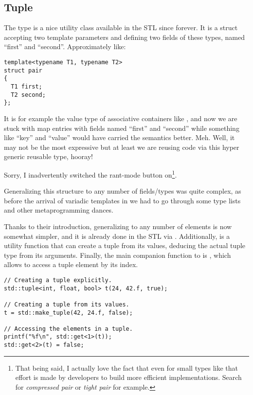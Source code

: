 \subsection{Tuple}
\label{sec:tuple}

\problemtitle

The type  is a nice utility class available in the STL
since forever. It is a struct accepting two template parameters and
defining two fields of these types, named ``first'' and
``second''. Approximately like:

\begin{lstlisting}
template<typename T1, typename T2>
struct pair
{
  T1 first;
  T2 second;
};
\end{lstlisting}

It is for example the value type of associative containers like
, and now we are stuck with map entries with fields
named ``first'' and ``second'' while something like ``key'' and
``value'' would have carried the semantics better. Meh. Well, it may
not be the most expressive but at least we are reusing code via this
hyper generic reusable type, hooray!

Sorry, I inadvertently switched the rant-mode button on\footnote{That
  being said, I actually love the fact that even for small types like
  that effort is made by \cpp{} developers to build more efficient
  implementations. Search for \emph{compressed pair} or \emph{tight
    pair} for example.}.

\solutiontitle

Generalizing this structure to any number of fields/types was quite
complex, as before the arrival of variadic templates
 in  we had to go through some type lists
and other metaprogramming dances.

%
%
Thanks to their introduction, generalizing  to any
number of elements is now somewhat simpler, and it is already done in
the STL via . Additionally, 
is a utility function that can create a tuple from its values,
deducing the actual tuple type from its arguments. Finally, the main
companion function to  is , which
allows to access a tuple element by its index.

\begin{lstlisting}
// Creating a tuple explicitly.
std::tuple<int, float, bool> t(24, 42.f, true);

// Creating a tuple from its values.
t = std::make_tuple(42, 24.f, false);

// Accessing the elements in a tuple.
printf("%f\n", std::get<1>(t));
std::get<2>(t) = false;
\end{lstlisting}

